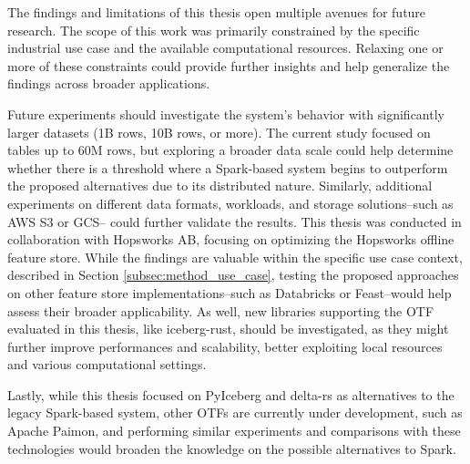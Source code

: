 The findings and limitations of this thesis open multiple avenues for future research. The scope of this work was primarily constrained by the specific industrial use case and the available computational resources. Relaxing one or more of these constraints could provide further insights and help generalize the findings across broader applications.

Future experiments should investigate the system's behavior with significantly larger datasets (1B rows, 10B rows, or more). The current study focused on tables up to 60M rows, but exploring a broader data scale could help determine whether there is a threshold where a Spark-based system begins to outperform the proposed alternatives due to its distributed nature. Similarly, additional experiments on different data formats, workloads, and storage solutions--such as \gls{AWS} S3 or \gls{GCS}-- could further validate the results. This thesis was conducted in collaboration with Hopsworks AB, focusing on optimizing the Hopsworks offline feature store. While the findings are valuable within the specific use case context, described in Section \ref{subsec:method_use_case}, testing the proposed approaches on other feature store implementations--such as Databricks or Feast--would help assess their broader applicability. As well, new libraries supporting the \gls{OTF} evaluated in this thesis, like iceberg-rust, should be investigated, as they might further improve performances and scalability, better exploiting local resources and various computational settings.

Lastly, while this thesis focused on PyIceberg and delta-rs as alternatives to the legacy Spark-based system, other \glspl{OTF} are currently under development, such as Apache Paimon, and performing similar experiments and comparisons with these technologies would broaden the knowledge on the possible alternatives to Spark.